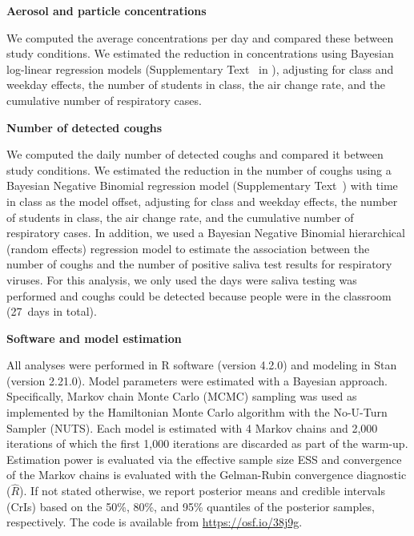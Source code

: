 \documentclass[fleqn,11pt]{wlscirep}
\begin{document}
\noindent\textbf{Aerosol and particle concentrations} \smallskip

\noindent We computed the average concentrations per day and compared these between study conditions. We estimated the reduction in concentrations using Bayesian log-linear regression models (Supplementary Text~ in \supp), adjusting for class and weekday effects, the number of students in class, the air change rate, and the cumulative number of respiratory cases. \medskip

\noindent\textbf{Number of detected coughs} \smallskip

\noindent We computed the daily number of detected coughs and compared it between study conditions. We estimated the reduction in the number of coughs using a Bayesian Negative Binomial regression model (Supplementary Text~) with time in class as the model offset, adjusting for class and weekday effects, the number of students in class, the air change rate, and the cumulative number of respiratory cases. In addition, we used a Bayesian Negative Binomial hierarchical (random effects) regression model to estimate the association between the number of coughs and the number of positive saliva test results for respiratory viruses. For this analysis, we only used the days were saliva testing was performed and coughs could be detected because people were in the classroom (27~days in total).  \medskip


\noindent\textbf{Software and model estimation} \smallskip

\noindent All analyses were performed in R software (version 4.2.0)\cite{RCoreTeam2022} and modeling in Stan (version 2.21.0)\cite{Carpenter2017}. Model parameters were estimated with a Bayesian approach. Specifically, Markov chain Monte Carlo (MCMC) sampling was used as implemented by the Hamiltonian Monte Carlo algorithm with the No-U-Turn Sampler (NUTS)\cite{Hoffman2014}. Each model is estimated with 4 Markov chains and 2,000 iterations of which the first 1,000 iterations are discarded as part of the warm-up. Estimation power is evaluated via the effective sample size ESS and convergence of the Markov chains is evaluated with the Gelman-Rubin convergence diagnostic ($\hat{R}$). If not stated otherwise, we report posterior means and credible intervals (CrIs) based on the 50\%, 80\%, and 95\% quantiles of the posterior samples, respectively. The code is available from \url{https://osf.io/38j9g}.

\end{document}
